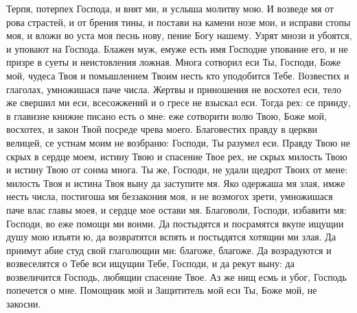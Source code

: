 \begin{mymulticols}
Терпя, потерпех Господа, и внят ми, и услыша молитву мою. И возведе мя от рова страстей, и от брения тины, и постави на камени нозе мои, и исправи стопы моя, и вложи во уста моя песнь нову, пение Богу нашему. Узрят мнози и убоятся, и уповают на Господа. Блажен муж, емуже есть имя Господне упование его, и не призре в суеты и неистовления ложная. Многа сотворил еси Ты, Господи, Боже мой, чудеса Твоя и помышлением Твоим несть кто уподобится Тебе. Bозвестих и глаголах, умножишася паче числа. Жертвы и приношения не восхотел еси, тело же свершил ми еси, всесожжений и о гресе не взыскал еси. Тогда рех: се прииду, в главизне книжне писано есть о мне: еже сотворити волю Твою, Боже мой, восхотех, и закон Твой посреде чрева моего. Благовестих правду в церкви велицей, се устнам моим не возбраню: Господи, Ты разумел еси. Правду Твою не скрых в сердце моем, истину Твою и спасение Твое рех, не скрых милость Твою и истину Твою от сонма многа. Ты же, Господи, не удали щедрот Твоих от мене: милость Твоя и истина Твоя выну да заступите мя. Яко одержаша мя злая, имже несть числа, постигоша мя беззакония моя, и не возмогох зрети, умножишася паче влас главы моея, и сердце мое остави мя. Благоволи, Господи, избавити мя: Господи, во еже помощи ми вонми. Да постыдятся и посрамятся вкупе ищущии душу мою изъяти ю, да возвратятся вспять и постыдятся хотящии ми злая. Да приимут абие студ свой глаголющии ми: благоже, благоже. Да возрадуются и возвеселятся о Тебе вси ищущии Тебе, Господи, и да рекут выну: да возвеличится Господь, любящии спасение Твое. Аз же нищ есмь и убог, Господь попечется о мне. Помощник мой и Защититель мой еси Ты, Боже мой, не закосни.

\end{mymulticols}

\mychapterending

